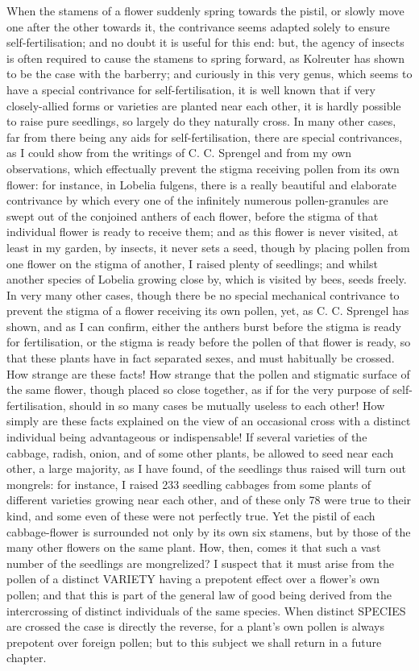 When the stamens of a flower suddenly spring towards the pistil, or slowly move one after the other towards it, the contrivance seems adapted solely to ensure self-fertilisation; and no doubt it is useful for this end: but, the agency of insects is often required to cause the stamens to spring forward, as Kolreuter has shown to be the case with the barberry; and curiously in this very genus, which seems to have a special contrivance for self-fertilisation, it is well known that if very closely-allied forms or varieties are planted near each other, it is hardly possible to raise pure seedlings, so largely do they naturally cross. In many other cases, far from there being any aids for self-fertilisation, there are special contrivances, as I could show from the writings of C. C. Sprengel and from my own observations, which effectually prevent the stigma receiving pollen from its own flower: for instance, in Lobelia fulgens, there is a really beautiful and elaborate contrivance by which every one of the infinitely numerous pollen-granules are swept out of the conjoined anthers of each flower, before the stigma of that individual flower is ready to receive them; and as this flower is never visited, at least in my garden, by insects, it never sets a seed, though by placing pollen from one flower on the stigma of another, I raised plenty of seedlings; and whilst another species of Lobelia growing close by, which is visited by bees, seeds freely. In very many other cases, though there be no special mechanical contrivance to prevent the stigma of a flower receiving its own pollen, yet, as C. C. Sprengel has shown, and as I can confirm, either the anthers burst before the stigma is ready for fertilisation, or the stigma is ready before the pollen of that flower is ready, so that these plants have in fact separated sexes, and must habitually be crossed. How strange are these facts! How strange that the pollen and stigmatic surface of the same flower, though placed so close together, as if for the very purpose of self-fertilisation, should in so many cases be mutually useless to each other! How simply are these facts explained on the view of an occasional cross with a distinct individual being advantageous or indispensable!
If several varieties of the cabbage, radish, onion, and of some other plants, be allowed to seed near each other, a large majority, as I have found, of the seedlings thus raised will turn out mongrels: for instance, I raised 233 seedling cabbages from some plants of different varieties growing near each other, and of these only 78 were true to their kind, and some even of these were not perfectly true. Yet the pistil of each cabbage-flower is surrounded not only by its own six stamens, but by those of the many other flowers on the same plant. How, then, comes it that such a vast number of the seedlings are mongrelized? I suspect that it must arise from the pollen of a distinct VARIETY having a prepotent effect over a flower's own pollen; and that this is part of the general law of good being derived from the intercrossing of distinct individuals of the same species. When distinct SPECIES are crossed the case is directly the reverse, for a plant's own pollen is always prepotent over foreign pollen; but to this subject we shall return in a future chapter.
